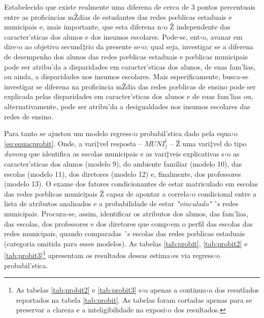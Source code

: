 \documentclass[a4paper, 12pt]{article}
\begin{document}
Estabelecido que existe realmente uma diferena de cerca de 3 pontos percentuais entre as proficincias mŽdias de estudantes das redes pœblicas estaduais e municipais e, mais importante, que esta diferena n‹o Ž independente das caracter’sticas dos alunos e dos insumos escolares. Pode-se, ent‹o, avanar  em dire‹o ao objetivo secund‡rio da presente se‹o; qual seja, investigar se a diferena de desempenho dos alunos das redes pœblicas estaduais e pœblicas municipais pode ser atribu’da a disparidades em caracter’sticas dos alunos, de suas fam’lias, ou ainda, a disparidades nos insumos escolares. Mais especificamente, busca-se investigar se diferena na proficincia mŽdia das redes pœblicas de ensino pode ser explicada pelas disparidades em caracter’sticas dos alunos e de suas fam’lias ou, alternativamente, pode ser atribu’da a desigualdades nos insumos escolares das redes de ensino.

Para tanto se ajustou um modelo regress‹o probabil’stica dado pela equa‹o \ref{eq:equacprobit}. Onde, a vari‡vel resposta -- $MUNI_{j}^{t}$ -- Ž uma vari‡vel do tipo \emph{dummy} que identifica as escolas municipais e as vari‡veis explicativas s‹o as caracter’sticas dos alunos (modelo 9), do ambiente familiar (modelo 10), das escolas (modelo 11), dos diretores (modelo 12) e, finalmente, dos professores (modelo 13). O exame dos fatores condicionantes de estar matriculado em escolas das redes pœblicas municipais Ž capaz de apontar a correla‹o condicional entre a lista de atributos analisados e a probabilidade de estar \emph{"vinculado"} ˆs redes municipais. Procura-se, assim, identificar os atributos dos alunos, das fam’lias, das escolas, dos professores e dos diretores que comp›em o perfil das escolas das redes municipais, quando comparadas ˆs escolas das redes pœblicas estaduais (categoria omitida para esses modelos). As tabelas \ref{tab:probit}, \ref{tab:probit2} e \ref{tab:probit3}\footnote{As tabelas \ref{tab:probit2} e \ref{tab:probit3} s‹o apenas a continua‹o dos resutlados reportados na tabela \ref{tab:probit}. As tabelas foram cortadas apenas para se preservar a clareza e a inteligibilidade na exposi‹o dos resultados.} apresentam os resultados dessas estima›es via regress‹o probabil’stica.  







\end{document}

